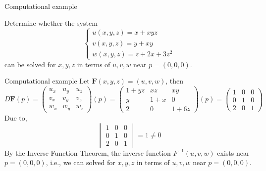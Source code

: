 \begin{frame}{Computational example}
    \begin{parchment}[Problem 03]
       Determine whether the system
        \begin{equation}
            \begin{cases}
                u(x, y, z) = x + xyz\\
                v(x, y, z) = y + xy\\
                w(x, y, z) = z + 2x + 3z^2
            \end{cases}
        \end{equation}
        can be solved for $x, y, z$ in terms of $u, v, w$ near $p = (0, 0, 0)$.
    \end{parchment}
\end{frame}

\begin{frame}{Computational example}
    Let $\mathbf{F}(x, y,z) = (u, v, w)$, then
    \begin{equation}
        D\mathbf{F}(p) = \begin{pmatrix}
         u_x& u_y & u_z\\ 
         v_x& v_y & v_z\\ 
         w_x& w_y & w_z
        \end{pmatrix}(p)
        = \begin{pmatrix}
         1+yz& xz & xy\\ 
         y& 1+x & 0\\ 
         2& 0 & 1+6z
        \end{pmatrix}(p)
        = \begin{pmatrix}
         1& 0 & 0\\ 
         0& 1 & 0\\ 
         2& 0 & 1
        \end{pmatrix}
    \end{equation}
    Due to,
    \begin{equation}
        \begin{vmatrix}
         1& 0 & 0\\ 
         0& 1 & 0\\ 
         2& 0 & 1
        \end{vmatrix} = 1 \ne 0
    \end{equation}
    By the Inverse Function Theorem, the inverse function $F^{-1}(u,v,w)$ exists near $p=(0, 0,0)$, i.e., we can solved for $x, y, z$ in terms of $u, v, w$ near $p = (0, 0, 0)$.
\end{frame}

